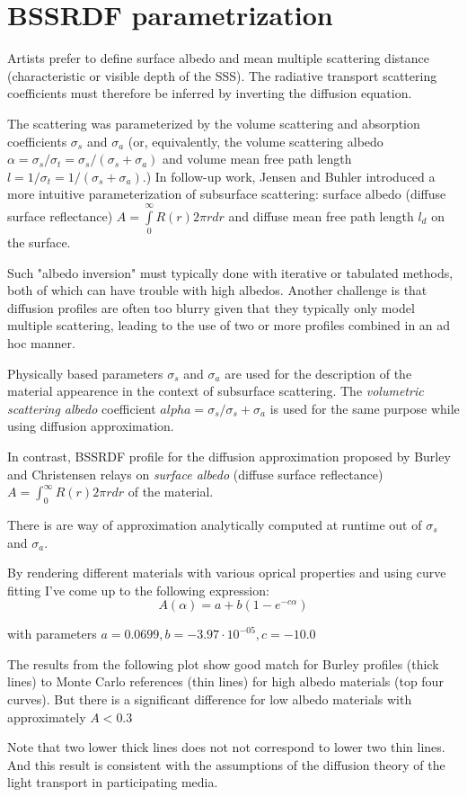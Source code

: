 \section{BSSRDF parametrization}

Artists prefer to define surface albedo and mean multiple scattering distance
(characteristic or visible depth of the SSS). The radiative transport scattering
coefficients must therefore be inferred by inverting the diffusion equation.


The scattering was parameterized by the volume scattering and absorption
coefficients $\sigma_s$ and $\sigma_a$ (or, equivalently, the volume
scattering albedo $\alpha = \sigma_s/\sigma_t = \sigma_s/(\sigma_s + \sigma_a)$
and volume mean free path length $l = 1/\sigma_t = 1/(\sigma_s + \sigma_a)$.)
In follow-up work, Jensen and Buhler \cite{Jensen:2002:RHR:566570.566619}
introduced a more intuitive parameterization of subsurface scattering:
surface albedo (diffuse surface reflectance) $A = \int\limits_0^\infty
R(r)2\pi r dr$ and diffuse mean free path length $l_d$ on the surface.

Such "albedo inversion" must typically done with iterative or tabulated methods,
both of which can have trouble with high albedos. Another challenge is that
diffusion profiles are often too blurry given that they typically only model
multiple scattering, leading to the use of two or more profiles combined in an
ad hoc manner.

Physically based parameters $\sigma_s$ and $\sigma_a$ are used for the
description of the material appearence in the context of subsurface
scattering. The \textit{volumetric scattering albedo} coefficient
$alpha = \sigma_s / \sigma_s+\sigma_a$ is used for the same purpose while using
diffusion approximation.


In contrast, BSSRDF profile for the diffusion approximation proposed by Burley
and Christensen relays on \textit{surface albedo} (diffuse surface reflectance)
$A=\int_0^{\infty} R(r)2\pi rdr$ of the material.

There is are way of approximation  analytically computed at runtime out of
$\sigma_s$ and $\sigma_a$. 

By rendering different materials with various oprical properties and using curve
fitting I've come up to the following expression:
\[
A(\alpha) = a + b(1- e^{-c\alpha})
\]

with parameters $a = 0.0699, b = -3.97\cdot 10^{-05}, c =-10.0$

The results from the following plot show good match for Burley profiles (thick
lines) to Monte Carlo references (thin lines) for high albedo materials (top
four curves). But there is a significant difference for low albedo materials
with approximately $A<0.3$

Note that two lower thick lines does not not correspond to lower two thin lines.
And this result is consistent with the assumptions of the diffusion theory of
the light transport in participating media.